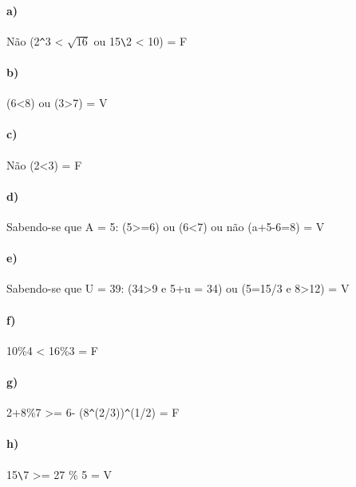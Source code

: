 \documentclass[pdftex,a4paper,12pt,brazil]{article} %
\begin{document}
\paragraph{a)} Não (2\verb!^!3 < $\sqrt{16}$ ou 15\verb!\!2 < 10) = F

\paragraph{b)} (6<8) ou (3>7) = V

\paragraph{c)} Não (2<3) = F

\paragraph{d)} Sabendo-se que A = 5: (5>=6) ou (6<7) ou não (a+5-6=8) = V

\paragraph{e)} Sabendo-se que U = 39: (34>9 e 5+u = 34) ou (5=15/3 e 8>12) = V

\paragraph{f)} 10\%4 < 16\%3 = F

\paragraph{g)} 2+8\%7 >= 6- (8\verb!^!(2/3))\verb!^!(1/2) = F

\paragraph{h)} 15\verb!\!7 >= 27 \% 5 = V



\end{document}
